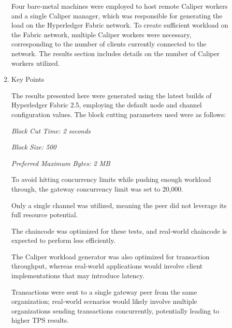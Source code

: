 \documentclass[conference]{IEEEtran}
\begin{document}
\begin{enumerate}[itemsep=2ex, parsep=1ex]
\begin{enumerate}[itemsep=2ex, parsep=1ex]
	      	      Four bare-metal machines were employed to host remote Caliper workers and
	      	      a single Caliper manager, which was responsible for generating the
	      	      load on the Hyperledger Fabric network. To create sufficient workload on
	      	      the Fabric network, multiple Caliper workers were necessary, corresponding
	      	      to the number of clients currently connected to the network. The
	      	      results section includes details on the number of Caliper workers
	      	      utilized.
	      	      	      	      	      	      
	      	\item Key Points
	      	      	      	      	      	      
	      	      The results presented here were generated using the latest builds of
	      	      Hyperledger Fabric 2.5, employing the default node and channel configuration
	      	      values. The block cutting parameters used were as follows:
	      	      	      	      	      	      
	      	      \textit{Block Cut Time: 2 seconds}
	      	      	      	      	      	      
	      	      \textit{Block Size: 500}
	      	      	      	      	      	      
	      	      \textit{Preferred Maximum Bytes: 2 MB}
	      	      	      	      	      	      
	      	      To avoid hitting concurrency limits while pushing enough workload
	      	      through, the gateway concurrency limit was set to 20,000.
	      	      	      	      	      	      
	      	      Only a single channel was utilized, meaning the peer did not leverage its
	      	      full resource potential.
	      	      	      	      	      	      
	      	      The chaincode was optimized for these tests, and real-world chaincode
	      	      is expected to perform less efficiently.
	      	      	      	      	      	      
	      	      The Caliper workload generator was also optimized for transaction
	      	      throughput, whereas real-world applications would involve client implementations
	      	      that may introduce latency.
	      	      	      	      	      	      
	      	      Transactions were sent to a single gateway peer from the same organization;
	      	      real-world scenarios would likely involve multiple organizations
	      	      sending transactions concurrently, potentially leading to higher TPS results.
	      	      	      	      	      	      

\end{enumerate}
\end{enumerate}
\end{document}
